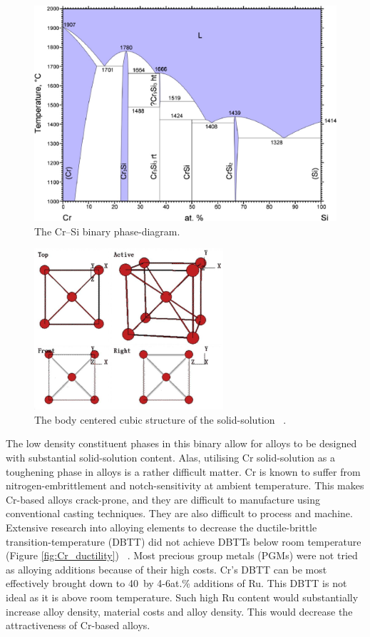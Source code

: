 %
\begin{figure}[H]
\begin{center}
\includegraphics[width=.9\textwidth]{CrSi}
\caption{The Cr--Si binary phase-diagram.}\label{fig:CrSi}
\end{center}
\end{figure}
%
%
\begin{figure}[H]
\begin{center}
\includegraphics[width=7cm]{BCC}
\caption{The body centered cubic structure of the solid-solution ~\cite{ashcroft76}.}\label{fig:BCC}
\end{center}
\end{figure} 
%
The low density constituent phases in this binary allow for alloys to be designed with substantial solid-solution content.  Alas, utilising Cr solid-solution as a toughening phase in alloys is a rather difficult matter.  Cr is known to suffer from nitrogen-embrittlement and notch-sensitivity at ambient temperature.  This makes Cr-based alloys crack-prone, and they are difficult to manufacture using conventional casting techniques.  They are also difficult to process and machine.  Extensive research into alloying elements to decrease the ductile-brittle transition-temperature (DBTT) did not achieve DBTTs below room temperature (Figure \ref{fig:Cr_ductility}) ~\cite{abrahamson57}. Most precious group metals (PGMs) were not tried as alloying additions because of their high costs.  Cr's DBTT can be most effectively brought down to 40\celsius\ by 4-6at.\% additions of Ru.  This DBTT is not ideal as it is above room temperature.  Such high Ru content would substantially increase alloy density, material costs and alloy density. This would decrease the attractiveness of Cr-based alloys.



